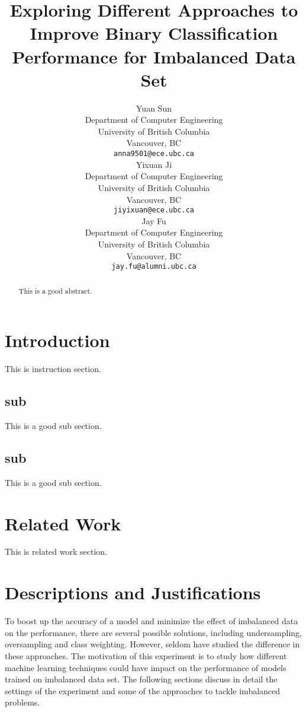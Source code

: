 \documentclass{article}
\title{Exploring Different Approaches to Improve Binary Classification Performance for Imbalanced Data Set}
\author{%
  Yuan Sun\\
  Department of Computer Engineering\\
  University of British Columbia\\
  Vancouver, BC\\
  \texttt{anna9501@ece.ubc.ca}\\
  \And
  Yixuan Ji\\
  Department of Computer Engineering\\
  University of British Columbia\\
  Vancouver, BC\\
  \texttt{jiyixuan@ece.ubc.ca}\\
  \AND
  Jay Fu\\
  Department of Computer Engineering\\
  University of British Columbia\\
  Vancouver, BC\\
  \texttt{jay.fu@alumni.ubc.ca}\\
}
\begin{document}

\maketitle

\begin{abstract}
  This is a good abstract.
\end{abstract}

\section{Introduction}

This is instruction section.

\subsection{sub}

This is a good sub section.

\subsection{sub}

This is a good sub section.

\section{Related Work}
\label{related_work}

This is related work section.

\section{Descriptions and Justifications}
\label{headings}

To boost up the accuracy of a model and minimize the effect of imbalanced data on the performance, there are several possible solutions, including undersampling, oversampling and class weighting. However, seldom have studied the difference in these approaches. The motivation of this experiment is to study how different machine learning techniques could have impact on the performance of models trained on imbalanced data set. The following sections discuss in detail the settings of the experiment and some of the approaches to tackle imbalanced problems.
\end{document}
